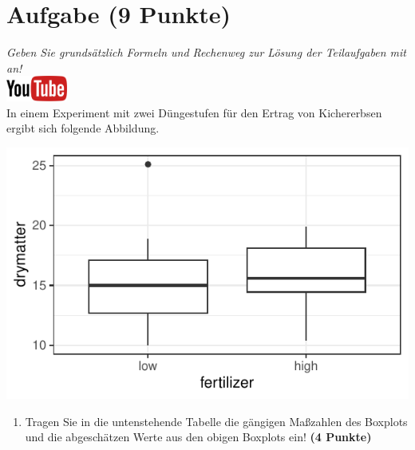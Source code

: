 \documentclass[a4paper, 10pt]{scrartcl}\usepackage[]{graphicx}\usepackage[]{xcolor}
\makeatletter
\def\maxwidth{ %
  \ifdim\Gin@nat@width>\linewidth
    \linewidth
  \else
    \Gin@nat@width
  \fi
}
\makeatother
\begin{document}
 
\clearpage

\section{Aufgabe \hfill (9 Punkte)}

\textit{Geben Sie grunds{\"a}tzlich Formeln und Rechenweg zur L{\"o}sung der
  Teilaufgaben mit an!} \\[1Ex]

\hfill\href{https://youtu.be/lXI_H6m26HE}{\includegraphics[width =
  2cm]{img/youtube}}\\[1Ex]


In einem Experiment mit zwei D{\"u}ngestufen f{\"u}r den Ertrag von Kichererbsen
ergibt sich folgende Abbildung. 





{\centering \includegraphics[width=\maxwidth]{img/boxplot-4b-1} 

}




\begin{enumerate}
\item Tragen Sie in die untenstehende Tabelle die g{\"a}ngigen Ma{\ss}zahlen des
  Boxplots und die abgesch{\"a}tzen Werte aus den obigen Boxplots ein! \textbf{(4 Punkte)}
\end{enumerate}
\end{document}

